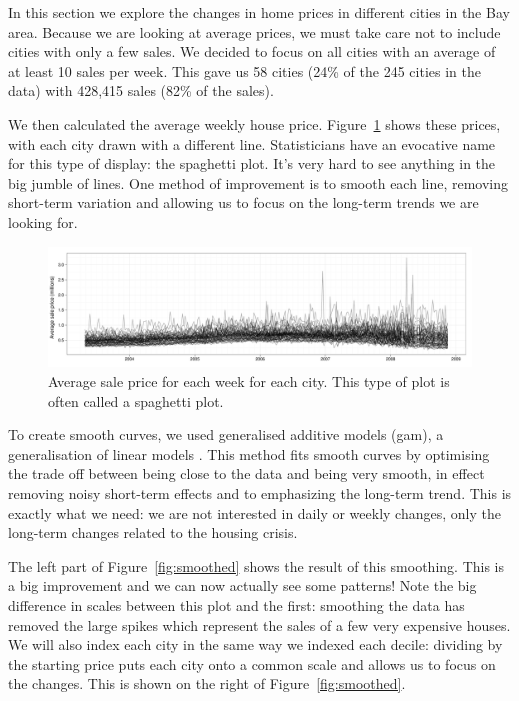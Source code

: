 \documentclass[oneside]{article}
\begin{document}
In this section we explore the changes in home prices in different cities in the Bay area.  Because we are looking at average prices, we must take care not to include cities with only a few sales. We decided to focus on all cities with an average of at least 10 sales per week. This gave us 58 cities (24\% of the 245 cities in the data) with 428,415 sales (82\% of the sales).  

We then calculated the average weekly house price. Figure~\ref{fig:spaghetti} shows these prices, with each city drawn with a different line.  Statisticians have an evocative name for this type of display: the spaghetti plot.  It's very hard to see anything in the big jumble of lines.  One method of improvement is to smooth each line, removing short-term variation and allowing us to focus on the long-term trends we are looking for.

\begin{figure}[htbp]
  \centering
    \includegraphics[width=0.9\linewidth]{cities-price}
  \caption{Average sale price for each week for each city.  This type of plot is often called a spaghetti plot.}
  \label{fig:spaghetti}
\end{figure}

To create smooth curves, we used generalised additive models ({\sc gam}), a generalisation of linear models \citep{wood:2006}.  This method fits smooth curves by optimising the trade off between being close to the data and being very smooth, in effect removing noisy short-term effects and to emphasizing the long-term trend.  This is exactly what we need: we are not interested in daily or weekly changes, only the long-term changes related to the housing crisis.

The left part of Figure~\ref{fig:smoothed} shows the result of this smoothing. This is a big improvement and we can now actually see some patterns! Note the big difference in scales between this plot and the first: smoothing the data has removed the large spikes which represent the sales of a few very expensive houses. We will also index each city in the same way we indexed each decile: dividing by the starting price puts each city onto a common scale and allows us to focus on the changes.  This is shown on the right of Figure~\ref{fig:smoothed}.  
\end{document}
